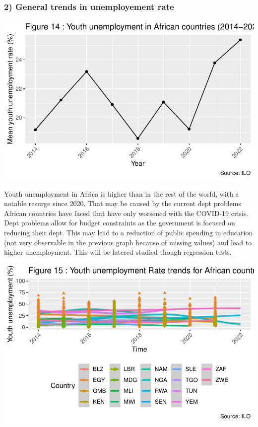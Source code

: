\documentclass[
  letterpaper,
  DIV=11,
  numbers=noendperiod]{scrartcl}
\begin{document}
\hypertarget{general-trends-in-unemployement-rate}{%
\subsubsection{2) General trends in unemployement
rate}\label{general-trends-in-unemployement-rate}}

\includegraphics{Projet-BM_files/figure-pdf/unnamed-chunk-28-1.pdf}

Youth unemployment in Africa is higher than in the rest of the world,
with a notable resurge since 2020. That may be caused by the current
dept problems African countries have faced that have only worsened with
the COVID-19 crisis. Dept problems allow for budget constraints as the
government is focused on reducing their dept. This may lead to a
reduction of public spending in education (not very observable in the
previous graph because of missing values) and lead to higher
unemployment. This will be latered studied though regression tests.

\includegraphics{Projet-BM_files/figure-pdf/unnamed-chunk-29-1.pdf}
\end{document}
